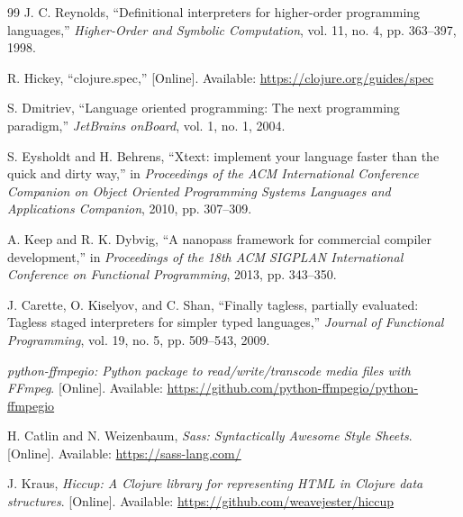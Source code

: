 \documentclass[conference]{IEEEtran}
\begin{document}
\begin{thebibliography}{99}
J. C. Reynolds, ``Definitional interpreters for higher-order programming languages,''
\emph{Higher-Order and Symbolic Computation}, vol. 11, no. 4, pp. 363--397, 1998.

R. Hickey, ``clojure.spec,''
[Online]. Available: \url{https://clojure.org/guides/spec}

S. Dmitriev, ``Language oriented programming: The next programming paradigm,''
\emph{JetBrains onBoard}, vol. 1, no. 1, 2004.

S. Eysholdt and H. Behrens, ``Xtext: implement your language faster than the quick and dirty way,''
in \emph{Proceedings of the ACM International Conference Companion on Object Oriented Programming Systems Languages and Applications Companion}, 2010, pp. 307--309.

A. Keep and R. K. Dybvig, ``A nanopass framework for commercial compiler development,''
in \emph{Proceedings of the 18th ACM SIGPLAN International Conference on Functional Programming}, 2013, pp. 343--350.

J. Carette, O. Kiselyov, and C. Shan, ``Finally tagless, partially evaluated: Tagless staged interpreters for simpler typed languages,''
\emph{Journal of Functional Programming}, vol. 19, no. 5, pp. 509--543, 2009.

\emph{python-ffmpegio: Python package to read/write/transcode media files with FFmpeg}.
[Online]. Available: \url{https://github.com/python-ffmpegio/python-ffmpegio}

H. Catlin and N. Weizenbaum, \emph{Sass: Syntactically Awesome Style Sheets}.
[Online]. Available: \url{https://sass-lang.com/}

J. Kraus, \emph{Hiccup: A Clojure library for representing HTML in Clojure data structures}.
[Online]. Available: \url{https://github.com/weavejester/hiccup}

\end{thebibliography}
\end{document}
